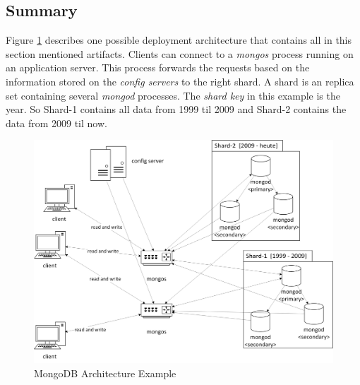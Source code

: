 \subsection{Summary}
Figure \ref{arch-example} describes one possible deployment architecture that contains all in this section mentioned artifacts. Clients can connect to a \textit{mongos} process running on an application server. This process forwards the requests based on the information stored on the \textit{config servers} to the right shard. A shard is an replica set containing several \textit{mongod} processes. The \textit{shard key} in this example is the year. So Shard-1 contains all data from 1999 til 2009 and Shard-2 contains the data from 2009 til now. 
\begin{figure}[H]
\includegraphics[width=\linewidth,keepaspectratio]{images/sharding.png}
\caption{MongoDB Architecture Example}
\label{arch-example}
\end{figure}
